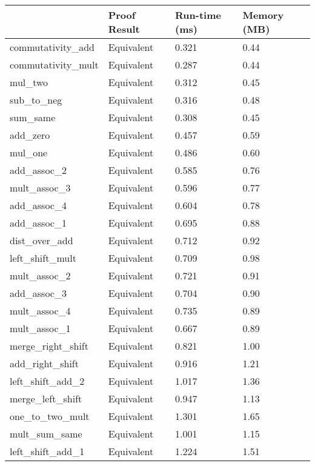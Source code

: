 \begin{tabular}{llll}
\toprule
 & Proof Result & Run-time (ms) & Memory (MB) \\
\midrule
commutativity\_add & Equivalent & 0.321 & 0.44 \\
commutativity\_mult & Equivalent & 0.287 & 0.44 \\
mul\_two & Equivalent & 0.312 & 0.45 \\
sub\_to\_neg & Equivalent & 0.316 & 0.48 \\
sum\_same & Equivalent & 0.308 & 0.45 \\
add\_zero & Equivalent & 0.457 & 0.59 \\
mul\_one & Equivalent & 0.486 & 0.60 \\
add\_assoc\_2 & Equivalent & 0.585 & 0.76 \\
mult\_assoc\_3 & Equivalent & 0.596 & 0.77 \\
add\_assoc\_4 & Equivalent & 0.604 & 0.78 \\
add\_assoc\_1 & Equivalent & 0.695 & 0.88 \\
dist\_over\_add & Equivalent & 0.712 & 0.92 \\
left\_shift\_mult & Equivalent & 0.709 & 0.98 \\
mult\_assoc\_2 & Equivalent & 0.721 & 0.91 \\
add\_assoc\_3 & Equivalent & 0.704 & 0.90 \\
mult\_assoc\_4 & Equivalent & 0.735 & 0.89 \\
mult\_assoc\_1 & Equivalent & 0.667 & 0.89 \\
merge\_right\_shift & Equivalent & 0.821 & 1.00 \\
add\_right\_shift & Equivalent & 0.916 & 1.21 \\
left\_shift\_add\_2 & Equivalent & 1.017 & 1.36 \\
merge\_left\_shift & Equivalent & 0.947 & 1.13 \\
one\_to\_two\_mult & Equivalent & 1.301 & 1.65 \\
mult\_sum\_same & Equivalent & 1.001 & 1.15 \\
left\_shift\_add\_1 & Equivalent & 1.224 & 1.51 \\
\bottomrule
\end{tabular}
